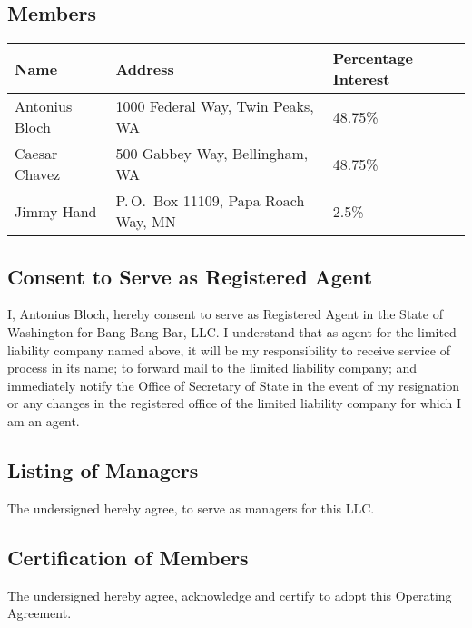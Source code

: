 \documentclass[11pt,onecolumn]{article}
\begin{document}
\subsection*{Members} \hfill

\begin{tabularx}{\textwidth}{ lXl }
  \hline
  \textbf{Name} & \textbf{Address} & \textbf{Percentage Interest} \\
  \hline 
 Antonius Bloch  & 1000 Federal Way, Twin Peaks, WA  & 48.75\%  \\
 Caesar Chavez  & 500 Gabbey Way, Bellingham, WA  & 48.75\%  \\
 Jimmy Hand  & P.\,O.\ Box 11109, Papa Roach Way, MN & 2.5\%  \\
  \hline
\end{tabularx}

\vspace{1\baselineskip}

\subsection*{Consent to Serve as Registered Agent}

I, Antonius Bloch, hereby consent to serve as Registered Agent in the State of Washington for Bang Bang Bar, LLC. I understand that as agent for the limited liability company named above, it will be my responsibility to receive service of process in its name; to forward mail to the limited liability company; and immediately notify the Office of Secretary of State in the event of my resignation or any changes in the registered office of the limited liability company for which I am an agent.


\vspace{1\baselineskip}

\newpage
\subsection*{Listing of Managers}

The undersigned hereby agree, to serve as managers for this LLC.



\vspace{1\baselineskip}

\subsection*{Certification of Members} The undersigned hereby agree, acknowledge and certify to adopt this Operating Agreement.



\end{document}
